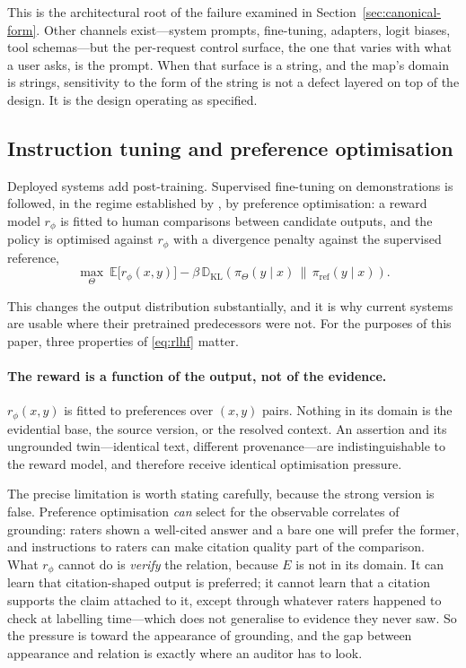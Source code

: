 \documentclass[11pt]{article}
\theoremstyle{plain}
\theoremstyle{definition}
\begin{document}
This is the architectural root of the failure examined in
Section~\ref{sec:canonical-form}. Other channels exist---system prompts,
fine-tuning, adapters, logit biases, tool schemas---but the per-request control
surface, the one that varies with what a user asks, is the prompt. When that surface
is a string, and
the map's domain is strings, sensitivity to the form of the string is not a defect
layered on top of the design. It is the design operating as specified.

\subsection{Instruction tuning and preference optimisation}
\label{sec:rlhf}

Deployed systems add post-training. Supervised fine-tuning on demonstrations is
followed, in the regime established by \citet{ouyang2022}, by preference
optimisation: a reward model $r_\phi$ is fitted to human comparisons between
candidate outputs, and the policy is optimised against $r_\phi$ with a divergence
penalty against the supervised reference,
\begin{equation}
  \max_{\Theta}\ \mathbb{E}\bigl[r_\phi(x, y)\bigr]
  - \beta\, \mathbb{D}_{\mathrm{KL}}\!\left(\pi_\Theta(y \mid x)
    \,\|\, \pi_{\mathrm{ref}}(y \mid x)\right).
  \label{eq:rlhf}
\end{equation}

This changes the output distribution substantially, and it is why current systems
are usable where their pretrained predecessors were not. For the purposes of this
paper, three properties of \eqref{eq:rlhf} matter.

\paragraph{The reward is a function of the output, not of the evidence.}
$r_\phi(x, y)$ is fitted to preferences over $(x, y)$ pairs. Nothing in its domain
is the evidential base, the source version, or the resolved context. An assertion
and its ungrounded twin---identical text, different provenance---are
indistinguishable to the reward model, and therefore receive identical
optimisation pressure.

The precise limitation is worth stating carefully, because the strong version is
false. Preference optimisation \emph{can} select for the observable correlates of
grounding: raters shown a well-cited answer and a bare one will prefer the former,
and instructions to raters can make citation quality part of the comparison. What
$r_\phi$ cannot do is \emph{verify} the relation, because $E$ is not in its domain.
It can learn that citation-shaped output is preferred; it cannot learn that a
citation supports the claim attached to it, except through whatever raters happened
to check at labelling time---which does not generalise to evidence they never saw.
So the pressure is toward the appearance of grounding, and the gap between appearance
and relation is exactly where an auditor has to look.
\end{document}
